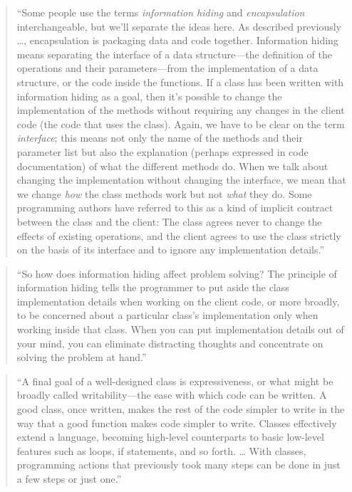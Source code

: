 \documentclass[]{tufte-book}
\begin{document}
\begin{quote}
``Some people use the terms \emph{information hiding} and \emph{encapsulation} interchangeable, but
we'll separate the ideas here. As described previously \ldots, encapsulation is
packaging data and code together. Information hiding means separating the interface of a
data structure---the definition of the operations and their parameters---from the implementation
of a data structure, or the code inside the functions. If a class has been written with
information hiding as a goal, then it's possible to change the implementation of the methods
without requiring any changes in the client code (the code that uses the class). Again, we
have to be clear on the term \emph{interface}; this means not only the name of the methods and
their parameter list but also the explanation (perhaps expressed in code documentation) of
what the different methods do. When we talk about changing the implementation without
changing the interface, we mean that we change \emph{how} the class methods work but not
\emph{what} they do. Some programming authors have referred to this as a kind of implicit contract
between the class and the client: The class agrees never to change the effects of
existing operations, and the client agrees to use the class strictly on the basis of its
interface and to ignore any implementation details.'' \citep{spraul2012think}
\end{quote}

\begin{quote}
``So how does information hiding affect problem solving? The principle of information hiding
tells the programmer to put aside the class implementation details when working on the
client code, or more broadly, to be concerned about a particular class's implementation
only when working inside that class. When you can put implementation details out of your
mind, you can eliminate distracting thoughts and concentrate on solving the problem at hand.''
\citep{spraul2012think}
\end{quote}

\begin{quote}
``A final goal of a well-designed class is expressiveness, or what might be broadly called
writability---the ease with which code can be written. A good class, once written, makes
the rest of the code simpler to write in the way that a good function makes code simpler to
write. Classes effectively extend a language, becoming high-level counterparts to basic
low-level features such as loops, if statements, and so forth. \ldots{} With classes, programming
actions that previously took many steps can be done in just a few steps or just one.''
\citep{spraul2012think}
\end{quote}
\end{document}
